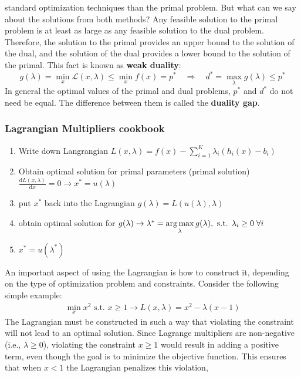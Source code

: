standard optimization techniques than the primal problem.\newline
But what can we say about the solutions from both methods? Any feasible solution to the primal problem is at least as large 
as any feasible solution to the dual problem. Therefore, the solution to the primal provides an upper bound to the solution 
of the dual, and the solution of the dual provides a lower bound to the solution of the primal. This fact is known as 
\textbf{weak duality}:
$$
g(\lambda) = \min_{x} \mathcal{L}(x, \lambda) \leq \min_{x} f(x) = p^* \quad \Rightarrow \quad d^* = \max_{\lambda} g(\lambda) \leq p^*
$$
In general the optimal values of the primal and dual problems, $ p^* $ and $ d^* $ do not need be equal. The difference between them 
is called the \textbf{duality gap}.
\subsubsection{Lagrangian Multipliers cookbook}
\begin{enumerate}
    \item Write down Langrangian  $L(x,\lambda) = f(x)- {\sum_{i=1}^K}\lambda_i(h_i(x)-b_i)$
    \item Obtain optimal solution for primal parameters (primal solution) $\frac{\text{d}L(x,\lambda)}{\text{d}x} = 0 
    \rightarrow x^* = u(\lambda)$
    \item put $x^*$ back into the Lagrangian $g(\lambda) = L(u(\lambda),\lambda)$
    \item obtain optimal solution for $g(\lambda) \rightarrow \lambda^* = \operatorname*{arg\,max}\limits_\lambda g(\lambda), 
    \text{ s.t. } \lambda_i \geq 0 \;\forall i$
    \item $x^* = u(\lambda^*)$
\end{enumerate}
An important aspect of using the Lagrangian is how to construct it, depending on the type of optimization problem and constraints.
Consider the following simple example:
\begin{gather*}
    \min\limits_x x^2 \text{ s.t. } x\geq1 \longrightarrow L(x,\lambda)= x^2 - \lambda(x-1)
\end{gather*}
The Lagrangian must be constructed in such a way that violating the constraint will not lead to an optimal solution.
Since Lagrange multipliers are non-negative (i.e., $\lambda \geq 0$), violating the constraint $x \geq 1$ would result in adding a positive 
term, even though the goal is to minimize the objective function. This ensures that when $x < 1$ the Lagrangian penalizes this violation,

